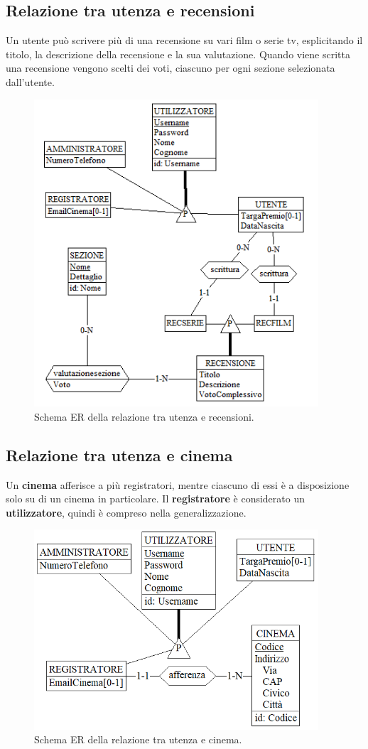 \documentclass[a4paper,12pt]{report}
\begin{document}
	\subsection{Relazione tra utenza e recensioni}
	Un utente può scrivere più di una recensione su vari film o serie tv, esplicitando il titolo, la descrizione della recensione e la sua valutazione. Quando viene scritta una recensione vengono scelti dei voti, ciascuno per ogni sezione selezionata dall'utente.
	\begin{figure}[H]
		\centering
		\includegraphics[width=300pt]{ER/utenzarecensione.png}
		\caption{Schema ER della relazione tra utenza e recensioni.}
	\end{figure}
	\subsection{Relazione tra utenza e cinema}
	Un \textbf{cinema} afferisce a più registratori, mentre ciascuno di essi è a disposizione solo su di un cinema in particolare. Il \textbf{registratore} è considerato un \textbf{utilizzatore}, quindi è compreso nella generalizzazione. 
	\begin{figure}[H]
		\centering
		\includegraphics[width=300pt]{ER/utenzacinema.png}
		\caption{Schema ER della relazione tra utenza e cinema.}
	\end{figure}
\end{document}
